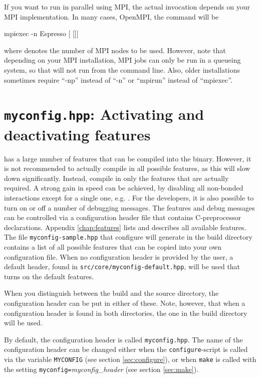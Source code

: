 If you want to run \es in parallel using MPI, the actual invocation
depends on your MPI implementation. In many cases, \eg OpenMPI, the
command will be
\begin{code}
mpiexec -n  Espresso [ []]
\end{code}
where  denotes the number of MPI nodes to be used.
However, note that depending on your MPI installation, MPI jobs can
only be run in a queueing system, so that \es will not run from the
command line. Also, older installations sometimes require ``-np''
instead of ``-n'' or ``mpirun'' instead of ``mpiexec''. 


\section{\texttt{myconfig.hpp}: Activating and deactivating features}
\label{sec:myconfig}

   \es
has a large number of features that can be compiled into the binary.
However, it is not recommended to actually compile in all possible
features, as this will slow down \es significantly.  Instead, compile
in only the features that are actually required.  A strong gain in
speed can be achieved, by disabling all non-bonded interactions except
for a single one, e.g. .  For the developers,
it is also possible to turn on or off a number of debugging messages.
The features and debug messages can be controlled via a configuration
header file that contains C-preprocessor declarations.  Appendix
\vref{chap:features} lists and describes all available features.  The
file \texttt{myconfig-sample.hpp} that configure will generate in the
build directory contains a list of all possible features that can be
copied into your own configuration file.  When no configuration header
is provided by the user, a default header, found in
\texttt{src/core/myconfig-default.hpp}, will be used that turns on the
default features.

When you distinguish between the build and the source directory, the
configuration header can be put in either of these. Note, however,
that when a configuration header is found in both directories, the one
in the build directory will be used.

By default, the configuration header is called \texttt{myconfig.hpp}.
The name of the configuration header can be changed either when the
\texttt{configure}-script is called via the variable
\mbox{\texttt{MYCONFIG}} (see section \vref{sec:configure}), or when
\texttt{make} is called with the setting
\mbox{\texttt{myconfig=}\textit{myconfig\_header}} (see section
\vref{sec:make}).

